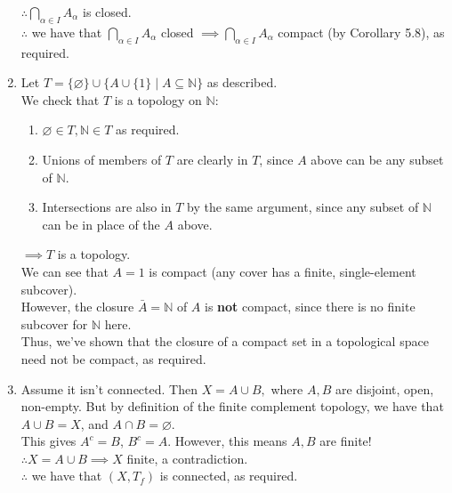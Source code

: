 \documentclass{article}
\newcommand{\N}{\mathbb{N}}
\renewcommand{\emptyset}{\varnothing}
\theoremstyle{remark}
\begin{document}
\begin{enumerate}
          $\therefore \bigcap_{\alpha \in I}A_\alpha$ is closed.\\
          $\therefore$ we have that
          $\bigcap_{\alpha \in I}A_\alpha$ closed
          $\implies \bigcap_{\alpha \in I}A_\alpha$ compact (by Corollary 5.8), as required.
          \pagebreak
    \item Let $T=\{\emptyset \} \cup \{ A \cup \{1\} \mid A \subseteq \N \}$
          as described.\\
          We check that $T$ is a topology on $\N$:
          \begin{enumerate}
              \item $\emptyset \in T, \N \in T$ as required.
              \item Unions of members of $T$ are clearly in $T$,
                    since $A$ above can be any subset of $\N$.
              \item Intersections are also in $T$ by the same argument,
                    since any subset of $\N$ can be in place of the $A$ above.
          \end{enumerate}
          $\implies T$ is a topology.\\
          We can see that $A={1}$ is compact
          (any cover has a finite, single-element subcover).\\
          However, the closure $\bar{A}=\N$ of $A$ is \textbf{not} compact,
          since there is no finite subcover for $\N$ here.\\
          Thus, we've shown that the closure of a compact set
          in a topological space need not be compact, as required.
    \item Assume it isn't connected. Then $X=A \cup B,$
          where $A, B$ are disjoint, open, non-empty.
          But by definition of the finite complement topology,
          we have that $A \cup B = X$, and $A \cap B = \emptyset$.\\
          This gives $A^c=B$, $B^c=A$.
          However, this means $A,B$ are finite!\\
          $\therefore X=A \cup B \implies X$ finite, a contradiction.\\
          $\therefore$ we have that $(X,T_f)$ is connected, as required.
\end{enumerate}
\end{document}
